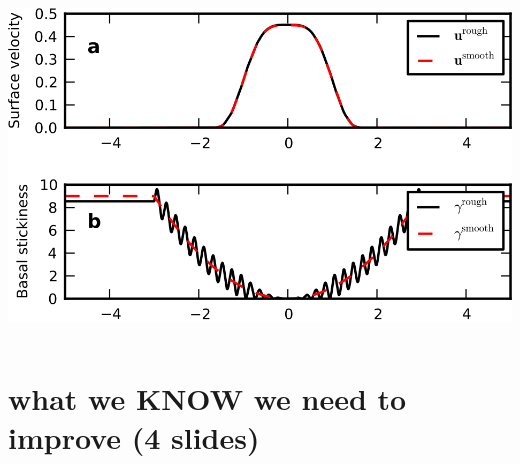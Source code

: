 \documentclass[hide notes,intlimits]{beamer}
\begin{document}
\begin{frame}
\begin{columns}
\begin{column}{0.5\textwidth}
\begin{center}
\bigskip
    \includegraphics[width=1.0\textwidth]{rough_smooth_forward}
  \end{center}
\end{column}
\end{columns}
\end{frame}


\section[to improve]{what we KNOW we need to improve (4 slides)}
\end{document}
